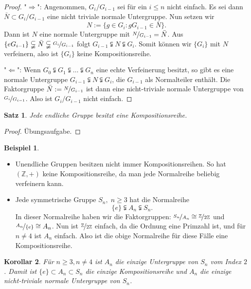 \documentclass[12pt]{scrartcl} %
\newtheorem{thm}{Satz}[section]
\newtheorem{kor}[thm]{Korollar}
\theoremstyle{definition}
\newtheorem{ex}{Beispiel}
\theoremstyle{remark}
\begin{document}
\begin{proof}
	"$\Rightarrow$": Angenommen, $G_i/G_{i-1}$ sei für ein $i\leq n$ nicht einfach. Es sei dann $\bar{N}\subset G_i/G_{i-1}$ eine nicht triviale normale Untergruppe. Nun setzen wir 
		\[N:=\{g\in G_i: gG_{i-1}\in\bar{N}\}.\]
	Dann ist $N$ eine normale Untergruppe mit $\nicefrac{N}{G_{i-1}}=\bar{N}$. Aus $\{eG_{i-1}\}\subsetneqq\bar{N}\subsetneqq\nicefrac{G_i}{G_{i-1}}$ folgt $G_{i-1}\subsetneqq N\subsetneqq G_i$. Somit können wir $\{G_i\}$ mit $N$ verfeinern, also ist $\{G_i\}$ keine Kompositionsreihe.
	
	"$\Leftarrow$": Wenn $G_0\subsetneqq G_1\subsetneqq\dots\subsetneqq G_n$ eine echte Verfeinerung besitzt, so gibt es eine normale Untergruppe $G_{i-1}\subsetneqq N\subsetneqq G_i$, die $G_{i-1}$ als Normalteiler enthält. Die Faktorgruppe $\bar{N}:=\nicefrac{N}{G_{i-1}}$ ist dann eine nicht-triviale normale Untergruppe von $\nicefrac{G_i}{G_{i-1}}$. Also ist $G_i/G_{i-1}$ nicht einfach.
\end{proof}

\begin{thm}
	Jede endliche Gruppe besitzt eine Kompositionsreihe.
\end{thm}

\begin{proof}
	Übungsaufgabe.
\end{proof}

\begin{ex}

	\begin{itemize}
		\item Unendliche Gruppen besitzen nicht immer Kompositionsreihen. So hat $(\mathbb{Z},+)$ keine Kompositionsreihe, da man jede Normalreihe beliebig verfeinern kann.
		\item Jede symmetrische Gruppe $S_n,\; n\geq 3$ hat die Normalreihe
			\[\{e\}\subsetneqq A_n \subsetneqq S_n.\]
			In dieser Normalreihe haben wir die Faktorgruppen: $\nicefrac{S_n}{A_n}\cong\nicefrac{\mathbb{Z}}{2\mathbb{Z}}$ und $\nicefrac{A_n}{\{e\}}\cong A_n$. Nun ist $\nicefrac{\mathbb{Z}}{2\mathbb{Z}}$ einfach, da die Ordnung eine Primzahl ist, und für $n\neq 4$ ist $A_n$ einfach. Also ist die obige Normalreihe für diese Fälle eine Kompositionsreihe.
	\end{itemize}
\end{ex}

\begin{kor}
	Für $n\geq 3,n\neq 4$ ist $A_n$ die einzige Untergruppe von $S_n$ vom Index $2$. Damit ist $\{e\}\subset A_n\subset S_n$ die einzige Kompositionsreihe und $A_n$ die einzige nicht-triviale normale Untergruppe von $S_n$.
\end{kor}
\end{document}
